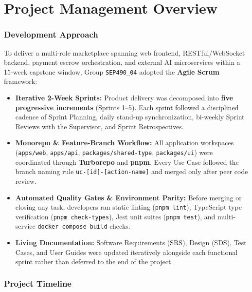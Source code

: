 \part{Project Management Overview}

\section{Development Approach}

To deliver a multi-role marketplace spanning web frontend, RESTful/WebSocket backend, payment escrow orchestration, and external AI microservices within a 15-week capstone window, Group \texttt{SEP490\_04} adopted the \textbf{Agile Scrum} framework:

\begin{itemize}[leftmargin=1.0cm, itemsep=4pt]
    \item \textbf{Iterative 2-Week Sprints:} Product delivery was decomposed into \textbf{five progressive increments} (Sprints 1--5). Each sprint followed a disciplined cadence of Sprint Planning, daily stand-up synchronization, bi-weekly Sprint Reviews with the Supervisor, and Sprint Retrospectives.
    \item \textbf{Monorepo \& Feature-Branch Workflow:} All application workspaces (\texttt{apps/web}, \texttt{apps/api}, \texttt{packages/shared-type}, \texttt{packages/ui}) were coordinated through \textbf{Turborepo} and \textbf{pnpm}. Every Use Case followed the branch naming rule \texttt{uc-[id]-[action-name]} and merged only after peer code review.
    \item \textbf{Automated Quality Gates \& Environment Parity:} Before merging or closing any task, developers ran static linting (\texttt{pnpm lint}), TypeScript type verification (\texttt{pnpm check-types}), Jest unit suites (\texttt{pnpm test}), and multi-service \texttt{docker compose build} checks.
    \item \textbf{Living Documentation:} Software Requirements (SRS), Design (SDS), Test Cases, and User Guides were updated iteratively alongside each functional sprint rather than deferred to the end of the project.
\end{itemize}

\section{Project Timeline}

